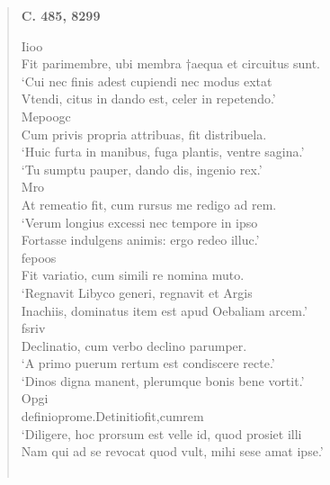 \documentclass[11pt, a4paper]{report}
\begin{document}
\begin{verse}
    \begin{center} \textbf{C. 485, 8299} \end{center} \marginpar{[14]} Iioo \\ Fit parimembre, ubi membra †aequa et circuitus sunt. \\ ‘Cui nec finis adest cupiendi nec modus extat \\ Vtendi, citus in dando est, celer in repetendo.’ \\ Mepoogc \\ Cum privis propria attribuas, fit distribuela. \\ ‘Huic furta in manibus, fuga plantis, ventre sagina.’ \\ ‘Tu sumptu pauper, dando dis, ingenio rex.’ \\ Mro \\ At remeatio fit, cum rursus me redigo ad rem. \\ ‘Verum longius excessi nec tempore in ipso \\ Fortasse indulgens animis: ergo redeo illuc.’ \\ fepoos \\ Fit variatio, cum simili re nomina muto. \\ ‘Regnavit Libyco generi, regnavit et Argis \\ Inachiis, dominatus item est apud Oebaliam arcem.’ \\ fsriv \\ Declinatio, cum verbo declino parumper. \\ ‘A primo puerum rertum est condiscere recte.’ \\ ‘Dinos digna manent, plerumque bonis bene vortit.’ \\ Opgi \\ definioprome.Detinitiofit,cumrem \\ ‘Diligere, hoc prorsum est velle id,  \lbrack quod prosiet illi \\ Nam qui ad se revocat quod vult, mihi sese amat ipse.’ \\ 
        ﻿\pagebreak 

\end{verse}
\end{document}

